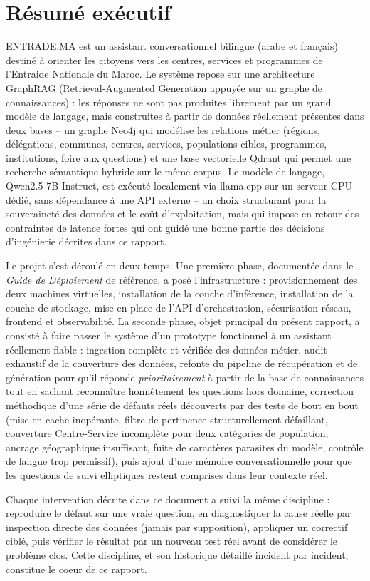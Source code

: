 \section{Résumé exécutif}

ENTRADE.MA est un assistant conversationnel bilingue (arabe et français) destiné à orienter les citoyens vers les centres, services et programmes de l'Entraide Nationale du Maroc. Le système repose sur une architecture GraphRAG (Retrieval-Augmented Generation appuyée sur un graphe de connaissances) : les réponses ne sont pas produites librement par un grand modèle de langage, mais construites à partir de données réellement présentes dans deux bases -- un graphe Neo4j qui modélise les relations métier (régions, délégations, communes, centres, services, populations cibles, programmes, institutions, foire aux questions) et une base vectorielle Qdrant qui permet une recherche sémantique hybride sur le même corpus. Le modèle de langage, Qwen2.5-7B-Instruct, est exécuté localement via llama.cpp sur un serveur CPU dédié, sans dépendance à une API externe -- un choix structurant pour la souveraineté des données et le coût d'exploitation, mais qui impose en retour des contraintes de latence fortes qui ont guidé une bonne partie des décisions d'ingénierie décrites dans ce rapport.

Le projet s'est déroulé en deux temps. Une première phase, documentée dans le \emph{Guide de Déploiement} de référence, a posé l'infrastructure : provisionnement des deux machines virtuelles, installation de la couche d'inférence, installation de la couche de stockage, mise en place de l'API d'orchestration, sécurisation réseau, frontend et observabilité. La seconde phase, objet principal du présent rapport, a consisté à faire passer le système d'un prototype fonctionnel à un assistant réellement fiable : ingestion complète et vérifiée des données métier, audit exhaustif de la couverture des données, refonte du pipeline de récupération et de génération pour qu'il réponde \emph{prioritairement} à partir de la base de connaissances tout en sachant reconnaître honnêtement les questions hors domaine, correction méthodique d'une série de défauts réels découverts par des tests de bout en bout (mise en cache inopérante, filtre de pertinence structurellement défaillant, couverture Centre-Service incomplète pour deux catégories de population, ancrage géographique insuffisant, fuite de caractères parasites du modèle, contrôle de langue trop permissif), puis ajout d'une mémoire conversationnelle pour que les questions de suivi elliptiques restent comprises dans leur contexte réel.

Chaque intervention décrite dans ce document a suivi la même discipline : reproduire le défaut sur une vraie question, en diagnostiquer la cause réelle par inspection directe des données (jamais par supposition), appliquer un correctif ciblé, puis vérifier le résultat par un nouveau test réel avant de considérer le problème clos. Cette discipline, et son historique détaillé incident par incident, constitue le coeur de ce rapport.
